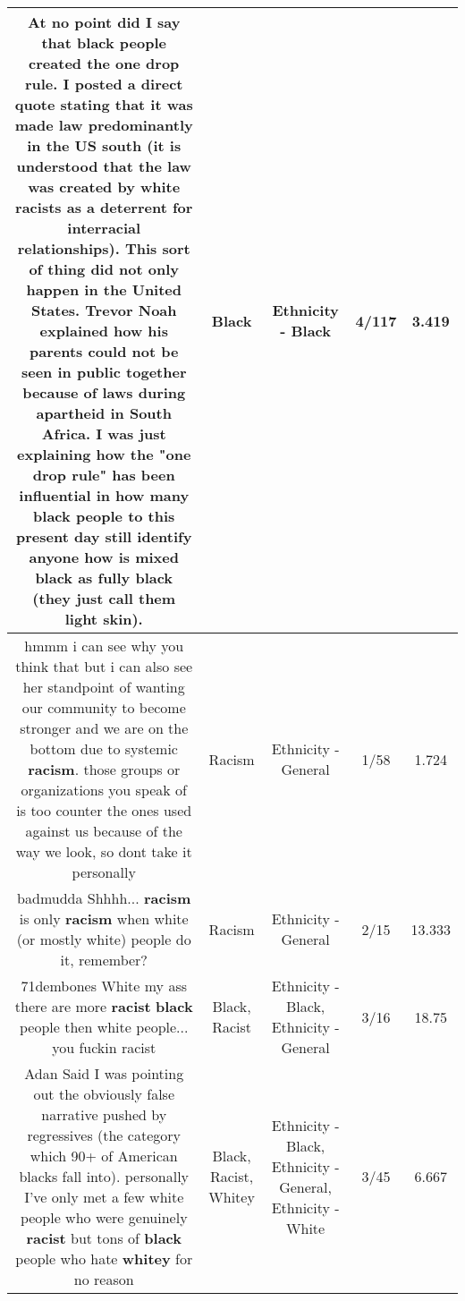 \documentclass[11pt]{article}
\newlength\mylength
\begin{document}
\begin{center}
\begin{longtable}{|C{.65\mylength}|C{.30\mylength}|C{.12\mylength}|C{.12\mylength}|C{.12\mylength}|}
  \small At no point did I say that \textbf{black} people created the one drop rule. I posted a direct quote stating that it was made law predominantly in the US south (it is understood that the law was created by white racists as a deterrent for interracial relationships). This sort of thing did not only happen in the United States. Trevor Noah explained how his parents could not be seen in public together because of laws during apartheid in South Africa. I was just explaining how the "one drop rule" has been influential in how many \textbf{black} people to this present day still identify anyone how is mixed \textbf{black} as fully \textbf{black} (they just call them light skin).\normalsize   & Black & Ethnicity - Black & 4/117 & 3.419 \\  \hline
  \small hmmm i can see why you think that but i can also see her standpoint of wanting our community to become stronger and we are on the bottom due to  systemic \textbf{racism}. those groups or organizations you speak of is too counter the ones used against us because of the way we look, so dont take it personally\normalsize   & Racism & Ethnicity - General & 1/58 & 1.724 \\  \hline
  \small badmudda Shhhh... \textbf{racism} is only \textbf{racism} when white (or mostly white) people do it, remember?\normalsize   & Racism & Ethnicity - General & 2/15 & 13.333 \\  \hline
  \small 71dembones White my ass there are more \textbf{racist} \textbf{black} people then white people... you fuckin racist\normalsize   & Black, Racist & Ethnicity - Black, Ethnicity - General & 3/16 & 18.75 \\  \hline
  \small Adan Said I was pointing out the obviously false narrative pushed by regressives (the category which 90+ of American blacks fall into). personally I've only met a few white people who were genuinely \textbf{racist} but tons of \textbf{black} people who hate \textbf{whitey} for no reason\normalsize   & Black, Racist, Whitey & Ethnicity - Black, Ethnicity - General, Ethnicity - White & 3/45 & 6.667 \\  \hline

\end{longtable}
\end{center}
\end{document}
